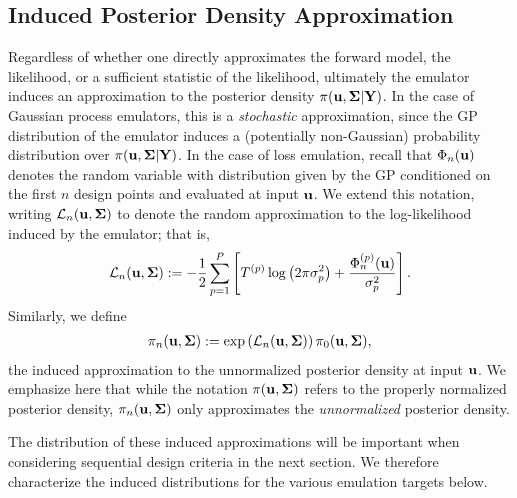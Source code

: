\documentclass[12pt]{article}
\begin{document}
\subsection{Induced Posterior Density Approximation}
Regardless of whether one directly approximates the forward model, the likelihood, or a sufficient statistic of the likelihood, ultimately the emulator induces an approximation to the posterior 
density $\pi(\mathbf{u}, \boldsymbol{\Sigma}|\mathbf{Y})$. In the case of Gaussian process emulators, this is a \textit{stochastic} approximation, since the GP distribution of the emulator induces 
a (potentially non-Gaussian) probability distribution over $\pi(\mathbf{u}, \boldsymbol{\Sigma}|\mathbf{Y})$. In the case of loss emulation, recall that ${\Phi}_{n}(\mathbf{u})$ denotes the random 
variable with distribution given by the GP conditioned on the first $n$ design points and evaluated at input $\mathbf{u}$. We extend this notation, writing $\mathcal{L}_{n}(\mathbf{u}, \boldsymbol{\Sigma})$ 
to denote the random approximation to the log-likelihood induced by the emulator; that is, 
\begin{align}
\mathcal{L}_{n}(\mathbf{u}, \boldsymbol{\Sigma}) := -\frac{1}{2} \sum_{p = 1}^{P} \left[{T}^{(p)} \log\left(2\pi \sigma_{p}^2 \right) + \frac{{\Phi}^{(p)}_{n}(\mathbf{u})}{\sigma_{p}^2} \right].
\end{align}
Similarly, we define 
\begin{align*}
\pi_{n}(\mathbf{u}, \boldsymbol{\Sigma}) := \exp\left(\mathcal{L}_{n}(\mathbf{u}, \boldsymbol{\Sigma})\right) \pi_0(\mathbf{u}, \boldsymbol{\Sigma}),
\end{align*}
the induced approximation to the unnormalized posterior density at input $\mathbf{u}$. We emphasize here that while the notation $\pi(\mathbf{u}, \boldsymbol{\Sigma})$ refers to the 
properly normalized posterior density, $\pi_{n}(\mathbf{u}, \boldsymbol{\Sigma})$ only approximates the \textit{unnormalized} posterior density. 

The distribution of 
these induced approximations will be important when considering sequential design criteria in the next section. We therefore characterize the induced distributions for the various emulation 
targets below. 
\end{document}
